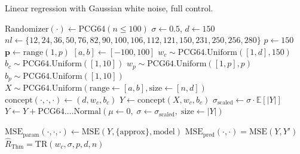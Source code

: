 \documentclass{article}
\begin{document}
\begin{algorithm}
    \caption{Linear regression with Gaussian white noise, full control.}
    \Begin
    {
    $\mathrm{Randomizer}(\cdot)\gets\mathrm{PCG64}(n\leq 100)$
    $\sigma\gets 0.5$, $d\gets 150$
    $nl\gets\{12,24,36,50,76,82,90,100,106,112,121,150,231,250,256,280\}$
    $p\gets 150$
    $\mathbf{p}\gets \mathrm{range}(1,p)$\; $[a,b]\gets [-100,100]$\;
    $w_{c}\sim \mathrm{PCG64}.\mathrm{Uniform}([1,d],150)$\; $b_{c}\sim \mathrm{PCG64}.\mathrm{Uniform}([1,10])$\;
    $w_{p}\sim \mathrm{PCG64}.\mathrm{Uniform}([1,p],p)$\; $b_{p}\sim \mathrm{PCG64}.\mathrm{Uniform}([1,10])$\;
    $X\sim\mathrm{PCG64}.\mathrm{Uniform}(\mathrm{range}\gets[a,b],\mathrm{size}\gets[n,d])$
    $\mathrm{concept}(\cdot,\cdot,\cdot)\gets (d,w_{c},b_{c})$\;
    $Y \gets \mathrm{concept}(X, w_{c},b_{c})$\;
    $\sigma_{\mathrm{scaled}} \gets \sigma \cdot \mathbb{E}\left[\lvert Y\rvert\right]$\;
    $Y \gets Y + \mathrm{PCG64}.…\mathrm{Normal}\left(\mu\gets 0,\;\sigma\gets \sigma_{\mathrm{scaled}},\;\mathrm{size}\gets\lvert Y\rvert\right)$ 

    $\mathrm{MSE}_{\mathrm{param}}(\cdot,\cdot,\cdot)\gets \mathrm{MSE}(Y,\{\mathrm{approx}\},\mathrm{model})$\;
    $\mathrm{MSE}_{\mathrm{pred}}(\cdot,\cdot)=\mathrm{MSE}(Y,Y')$
    $\hat{R}_{\mathrm{Thm}}=\mathrm{TR}(w_{c},\sigma,p,d,n)$\;
    }
    \label{algo:algo_reg_lin_1}
\end{algorithm}
\end{document}
